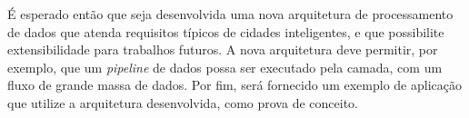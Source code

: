 É esperado então que seja desenvolvida uma nova arquitetura de processamento
de dados que atenda requisitos típicos de cidades inteligentes, e que possibilite
extensibilidade para trabalhos futuros. A nova arquitetura deve permitir,
por exemplo, que um \textit{pipeline} de dados possa ser executado pela camada,
com um fluxo de grande massa de dados. Por fim, será fornecido um exemplo de
aplicação que utilize a arquitetura desenvolvida, como prova de conceito.
